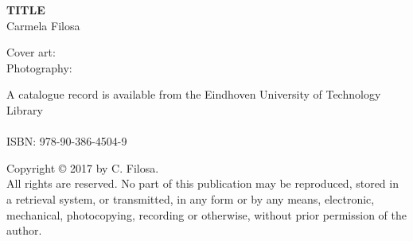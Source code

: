 
\thispagestyle{plain}

\vspace*{4cm}

\begin{center}
{\Huge \textbf{TITLE}}\\
\vspace{1cm}
{\huge{Carmela Filosa}}
\end{center}



\clearpage
\thispagestyle{plain}

\vspace*{\fill}



\noindent Cover art: \\
Photography: 

\vspace{1cm}

\noindent A catalogue record is available from the Eindhoven University of Technology Library\\
\\
\noindent ISBN:  978-90-386-4504-9\\

\vspace{1cm}

\noindent Copyright \copyright{} 2017 by C. Filosa. \\
All rights are reserved. No part of this publication may be reproduced, stored in a retrieval system, or transmitted, in any form or by any means, electronic, mechanical, photocopying, recording or otherwise, without prior permission of the author.

\clearpage


\thispagestyle{plain}

